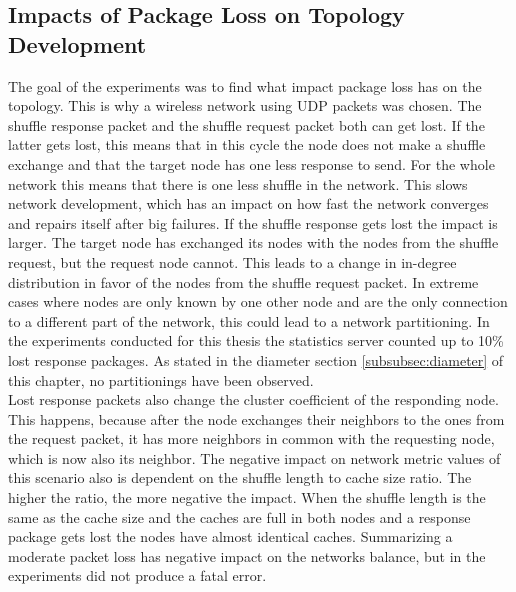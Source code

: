 \subsection{Impacts of Package Loss on Topology Development}
	The goal of the experiments was to find what impact package loss has on the
	topology. This is why a wireless network using UDP packets was chosen. The
	shuffle response packet and the shuffle request packet both can get lost. If
	the latter gets lost, this means that in this cycle the node does not make
	a shuffle exchange and that the target node has one less response to send.
	For the whole network this means that there is one less shuffle in the
	network. This slows network development, which has an impact on how fast the
	network converges and repairs itself after big failures.
	If the shuffle response gets lost the impact is larger. The target node has
	exchanged its nodes with the nodes from the shuffle request, but the request
	node cannot. This leads to a change in in-degree distribution in favor of the
	nodes from the shuffle request packet. In extreme cases where nodes are only
	known by one other node and are the only connection to a different part of
	the network, this could lead to a network partitioning. In the experiments
	conducted for this thesis the statistics server counted up to 10\% lost
	response packages. As stated in the diameter section \ref{subsubsec:diameter}
	of this chapter, no partitionings have been observed.\\
	Lost response packets also change the cluster coefficient of the responding
	node. This happens, because after the node exchanges their neighbors to the
	ones from the request packet, it has more neighbors in common with the requesting node,
	which is now also its neighbor. The negative impact on network metric values of
	this scenario also is dependent on the shuffle length to cache size ratio. The
	higher the ratio, the more negative the impact. When the shuffle length is the
	same as the cache size and the caches are full in both nodes and a response
	package gets lost the nodes have almost identical caches. Summarizing a
	moderate packet loss has negative impact on the networks balance, but in the
	experiments did not produce a fatal error.
